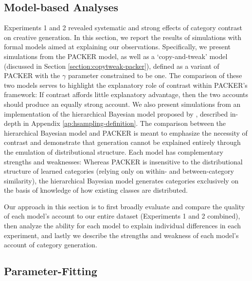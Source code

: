 \documentclass[12pt]{article}
\begin{document}
\begin{flushleft}
\section{Model-based Analyses}

Experiments 1 and 2 revealed systematic and strong effects of category contrast on creative generation. In this section, we report the results of simulations with formal models aimed at explaining our observations. Specifically, we present simulations from the PACKER model, as well as a `copy-and-tweak' model (discussed in Section \ref{section:copytweak-packer}), defined as a variant of PACKER with the $\gamma$ parameter constrained to be one. The comparison of these two models serves to highlight the explanatory role of contrast within PACKER's framework: If contrast affords little explanatory advantage, then the two accounts should produce an equally strong account. We also present simulations from an implementation of the hierarchical Bayesian model proposed by \cite{jern2013probabilistic}, described in-depth in Appendix \ref{ap:hsampling-definition}. The comparison between the hierarchical Bayesian model and PACKER is meant to emphasize the necessity of contrast and demonstrate that generation cannot be explained entirely through the emulation of distributional structure. Each model has complementary strengths and weaknesses: Whereas PACKER is insensitive to the distributional structure of learned categories (relying only on within- and between-category similarity), the hierarchical Bayesian model generates categories exclusively on the basis of knowledge of how existing classes are distributed. 

Our approach in this section is to first broadly evaluate and compare the quality of each model's account to our entire dataset (Experiments 1 and 2 combined), then analyze the ability for each model to explain individual differences in each experiment, and lastly we describe the strengths and weakness of each model's account of category generation.

\subsection{Parameter-Fitting}


\end{flushleft}
\end{document}

